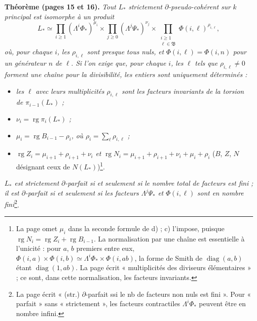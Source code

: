 \documentclass[11pt,a4paper]{article}
\begin{document}
\textbf{Théorème (pages 15 et 16).} \emph{Tout $L_{*}$ strictement
$\partial$-pseudo-cohérent sur $k$ principal est isomorphe à un produit
\[
  L_{*} \simeq \prod_{i \geqslant 1} (\Lambda^{i}\Phi_{*})^{\mu_{i}} \times
  \prod_{j \geqslant 0} (\Lambda^{j}\Psi_{*})^{\nu_{j}} \times
  \prod_{\substack{i \geqslant 1 \\ \ell \in \mathfrak{B}}}
  \Phi(i,\ell)^{\rho_{i,\ell}},
\]
où, pour chaque $i$, les $\rho_{i,\ell}$ sont presque tous nuls, et
$\Phi(i,\ell) = \Phi(i,n)$ pour un générateur $n$ de $\ell$. Si l'on exige
que, pour chaque $i$, les $\ell$ tels que $\rho_{i,\ell} \neq 0$ forment une
chaîne pour la divisibilité, les entiers sont uniquement déterminés :}
\begin{itemize}
\item[a)] \emph{les $\ell$ avec leurs multiplicités $\rho_{i,\ell}$ sont les
facteurs invariants de la torsion de $\pi_{i-1}(L_{*})$ ;}
\item[b)] \emph{$\nu_{i} = \operatorname{rg} \pi_{i}(L_{*})$ ;}
\item[c)] \emph{$\mu_{i} = \operatorname{rg} B_{i-1} - \rho_{i}$, où
$\rho_{i} = \sum_{\ell} \rho_{i,\ell}$ ;}
\item[d)] \emph{$\operatorname{rg} Z_{i} = \mu_{i+1} + \rho_{i+1} + \nu_{i}$
et $\operatorname{rg} N_{i} = \mu_{i+1} + \rho_{i+1} + \nu_{i} + \mu_{i} +
\rho_{i}$} ($B$, $Z$, $N$ désignant ceux de $N(L_{*})$)\footnote{La page
omet $\mu_{i}$ dans la seconde formule de d) ; c) l'impose, puisque
$\operatorname{rg} N_{i} = \operatorname{rg} Z_{i} + \operatorname{rg}
B_{i-1}$. La normalisation par une chaîne est essentielle à l'unicité :
pour $a$, $b$ premiers entre eux, $\Phi(i,a) \times \Phi(i,b) \simeq
\Lambda^{i}\Phi_{*} \times \Phi(i,ab)$, la forme de Smith de
$\operatorname{diag}(a,b)$ étant $\operatorname{diag}(1,ab)$. La page écrit
« multiplicités des diviseurs élémentaires » ; ce sont, dans cette
normalisation, les facteurs invariants.}.
\end{itemize}
\emph{$L_{*}$ est strictement $\partial$-parfait si et seulement si le nombre
total de facteurs est fini ; il est $\partial$-parfait si et seulement si les
facteurs $\Lambda^{j}\Psi_{*}$ et $\Phi(i,\ell)$ sont en nombre
fini}\footnote{La page écrit « (str.) $\partial$-parfait ssi le nb de
facteurs non nuls est fini ». Pour « parfait » sans « strictement », les
facteurs contractiles $\Lambda^{i}\Phi_{*}$ peuvent être en nombre infini.}.
\end{document}

